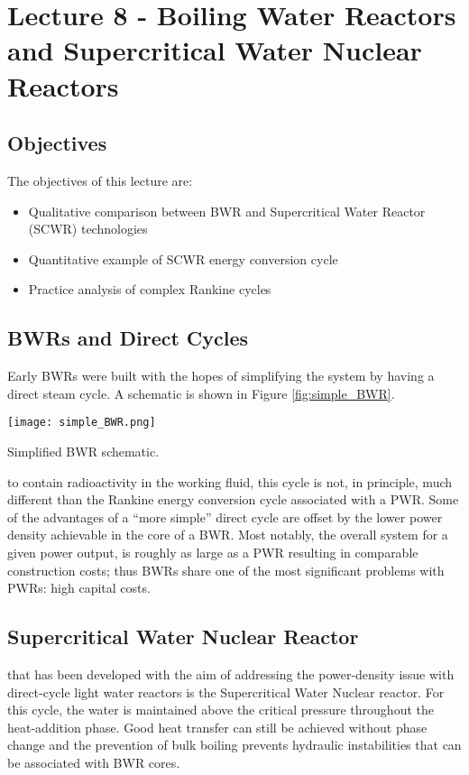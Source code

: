 \chapter{Lecture 8 - Boiling Water Reactors and Supercritical Water Nuclear Reactors}
\label{ch:ch8}
\section{Objectives}
The objectives of this lecture are:
\begin{itemize}
\item Qualitative comparison between BWR and Supercritical Water Reactor (SCWR) technologies
\item Quantitative example of SCWR energy conversion cycle
\item Practice analysis of complex Rankine cycles
\end{itemize}

\section{BWRs and Direct Cycles}
Early BWRs were built with the hopes of simplifying the system by having a direct steam cycle.  A schematic is shown in Figure \ref{fig:simple_BWR}.  
\begin{marginfigure}
\texttt{[image: simple\_BWR.png]}
\caption{Simplified BWR schematic.}
\label{fig:simple_BWR}
\end{marginfigure}
 to contain radioactivity in the working fluid, this cycle is not, in principle, much different than the Rankine energy conversion cycle associated with a PWR.  Some of the advantages of a ``more simple'' direct cycle are offset by the lower power density achievable in the core of a BWR.  Most notably, the overall system for a given power output, is roughly as large as a PWR resulting in comparable construction costs; thus BWRs share one of the most significant problems with PWRs: high capital costs.

\section{Supercritical Water Nuclear Reactor}
 that has been developed with the aim of addressing the power-density issue with direct-cycle light water reactors is the Supercritical Water Nuclear reactor.\cite{tsiklauri2005supercritical} For this cycle, the water is maintained above the critical pressure throughout the heat-addition phase.  Good heat transfer can still be achieved without phase change and the prevention of bulk boiling prevents hydraulic instabilities that can be associated with BWR cores.  

